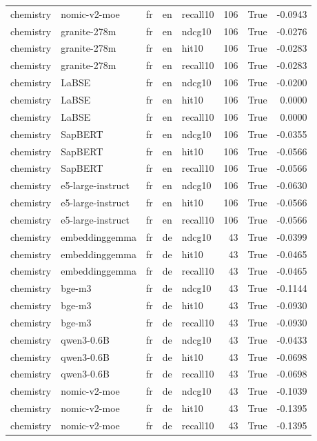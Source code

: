 \begin{tabular}{lllllrrr}
chemistry & nomic-v2-moe & fr & en & recall10 & 106 & True & -0.0943 \\
chemistry & granite-278m & fr & en & ndcg10 & 106 & True & -0.0276 \\
chemistry & granite-278m & fr & en & hit10 & 106 & True & -0.0283 \\
chemistry & granite-278m & fr & en & recall10 & 106 & True & -0.0283 \\
chemistry & LaBSE & fr & en & ndcg10 & 106 & True & -0.0200 \\
chemistry & LaBSE & fr & en & hit10 & 106 & True & 0.0000 \\
chemistry & LaBSE & fr & en & recall10 & 106 & True & 0.0000 \\
chemistry & SapBERT & fr & en & ndcg10 & 106 & True & -0.0355 \\
chemistry & SapBERT & fr & en & hit10 & 106 & True & -0.0566 \\
chemistry & SapBERT & fr & en & recall10 & 106 & True & -0.0566 \\
chemistry & e5-large-instruct & fr & en & ndcg10 & 106 & True & -0.0630 \\
chemistry & e5-large-instruct & fr & en & hit10 & 106 & True & -0.0566 \\
chemistry & e5-large-instruct & fr & en & recall10 & 106 & True & -0.0566 \\
chemistry & embeddinggemma & fr & de & ndcg10 & 43 & True & -0.0399 \\
chemistry & embeddinggemma & fr & de & hit10 & 43 & True & -0.0465 \\
chemistry & embeddinggemma & fr & de & recall10 & 43 & True & -0.0465 \\
chemistry & bge-m3 & fr & de & ndcg10 & 43 & True & -0.1144 \\
chemistry & bge-m3 & fr & de & hit10 & 43 & True & -0.0930 \\
chemistry & bge-m3 & fr & de & recall10 & 43 & True & -0.0930 \\
chemistry & qwen3-0.6B & fr & de & ndcg10 & 43 & True & -0.0433 \\
chemistry & qwen3-0.6B & fr & de & hit10 & 43 & True & -0.0698 \\
chemistry & qwen3-0.6B & fr & de & recall10 & 43 & True & -0.0698 \\
chemistry & nomic-v2-moe & fr & de & ndcg10 & 43 & True & -0.1039 \\
chemistry & nomic-v2-moe & fr & de & hit10 & 43 & True & -0.1395 \\
chemistry & nomic-v2-moe & fr & de & recall10 & 43 & True & -0.1395 \\

\end{tabular}
